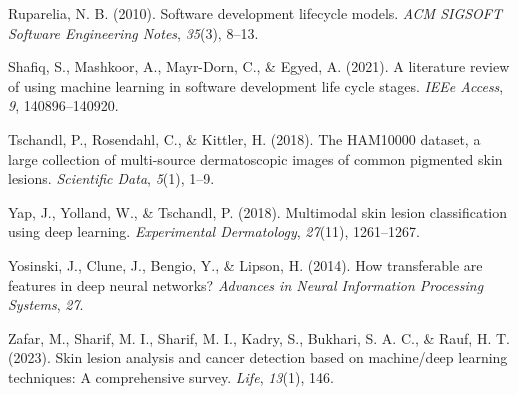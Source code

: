 \documentclass[
  12pt,
  oneside]{article}
\newlength{\cslhangindent}
\newenvironment{CSLReferences}[2] %
 {\begin{list}{}{%
  \setlength{\itemindent}{0pt}
  \setlength{\leftmargin}{0pt}
  \setlength{\parsep}{0pt}
  \ifodd #1
   \setlength{\leftmargin}{\cslhangindent}
   \setlength{\itemindent}{-1\cslhangindent}
  \fi
  \setlength{\itemsep}{#2\baselineskip}}}
 {\end{list}}
\begin{document}
\begin{CSLReferences}{1}{0}
Ruparelia, N. B. (2010). Software development lifecycle models.
\emph{ACM SIGSOFT Software Engineering Notes}, \emph{35}(3), 8--13.

Shafiq, S., Mashkoor, A., Mayr-Dorn, C., \& Egyed, A. (2021). A
literature review of using machine learning in software development life
cycle stages. \emph{IEEe Access}, \emph{9}, 140896--140920.

Tschandl, P., Rosendahl, C., \& Kittler, H. (2018). The HAM10000
dataset, a large collection of multi-source dermatoscopic images of
common pigmented skin lesions. \emph{Scientific Data}, \emph{5}(1),
1--9.

Yap, J., Yolland, W., \& Tschandl, P. (2018). Multimodal skin lesion
classification using deep learning. \emph{Experimental Dermatology},
\emph{27}(11), 1261--1267.

Yosinski, J., Clune, J., Bengio, Y., \& Lipson, H. (2014). How
transferable are features in deep neural networks? \emph{Advances in
Neural Information Processing Systems}, \emph{27}.

Zafar, M., Sharif, M. I., Sharif, M. I., Kadry, S., Bukhari, S. A. C.,
\& Rauf, H. T. (2023). Skin lesion analysis and cancer detection based
on machine/deep learning techniques: A comprehensive survey.
\emph{Life}, \emph{13}(1), 146.

\end{CSLReferences}
\end{document}
